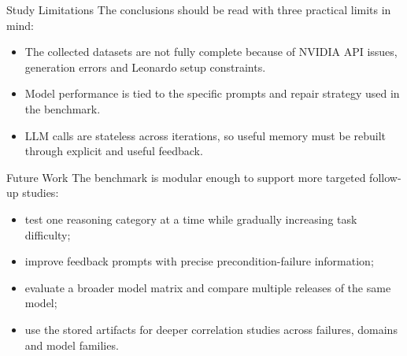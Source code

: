 \documentclass{beamer}
\begin{document}
\begin{frame}{Study Limitations}\footnotesize
    The conclusions should be read with three practical limits in mind:

    \vspace{0.3cm}
    \begin{itemize}
        \item The collected datasets are not fully complete because of NVIDIA API issues, generation errors and Leonardo setup constraints.
        \item Model performance is tied to the specific prompts and repair strategy used in the benchmark.
        \item LLM calls are stateless across iterations, so useful memory must be rebuilt through explicit and useful feedback.
    \end{itemize}
\end{frame}

\begin{frame}{Future Work}\footnotesize
    The benchmark is modular enough to support more targeted follow-up studies:

    \vspace{0.3cm}
    \begin{itemize}
        \item test one reasoning category at a time while gradually increasing task difficulty;
        \item improve feedback prompts with precise precondition-failure information;
        \item evaluate a broader model matrix and compare multiple releases of the same model;
        \item use the stored artifacts for deeper correlation studies across failures, domains and model families.
    \end{itemize}
\end{frame}
\end{document}

